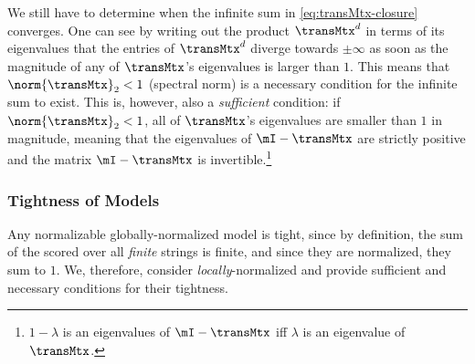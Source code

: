 We still have to determine when the infinite sum in \cref{eq:transMtx-closure} converges.
One can see by writing out the product $\transMtx^d$ in terms of its eigenvalues that the entries of $\transMtx^d$ diverge towards $\pm \infty$ as soon as the magnitude of any of $\transMtx$'s eigenvalues is larger than $1$.
This means that $\norm{\transMtx}_2 < 1$ (spectral norm) is a necessary condition for the infinite sum to exist.
This is, however, also a \emph{sufficient} condition: if $\norm{\transMtx}_2 < 1$, all of $\transMtx$'s eigenvalues are smaller than $1$ in magnitude, meaning that the eigenvalues of $\mI - \transMtx$ are strictly positive and the matrix $\mI - \transMtx$ is invertible.\footnote{$1 - \lambda$ is an eigenvalues of $\mI - \transMtx$ iff $\lambda$ is an eigenvalue of $\transMtx$.}

\subsubsection{Tightness of \ngram{} Models}
Any normalizable globally-normalized \ngram{} model is tight, since by definition, the sum of the scored over all \emph{finite} strings is finite, and since they are normalized, they sum to $1$.
We, therefore, consider \emph{locally}-normalized \ngram{} and provide sufficient and necessary conditions for their tightness.

